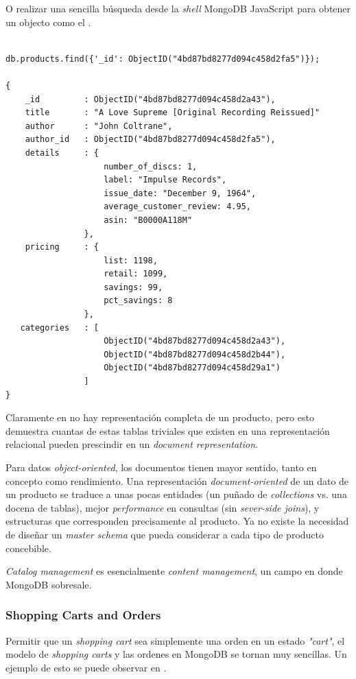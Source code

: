 O realizar una sencilla búsqueda desde la \textit{shell} MongoDB JavaScript  para obtener un objecto  como el .

\medskip
\begin{lstlisting}[caption= Busqueda en MongoDB, label=source:javascript:example_search_mongodb]

db.products.find({'_id': ObjectID("4bd87bd8277d094c458d2fa5")});

{
	_id			: ObjectID("4bd87bd8277d094c458d2a43"),
	title		: "A Love Supreme [Original Recording Reissued]"
	author		: "John Coltrane",
	author_id	: ObjectID("4bd87bd8277d094c458d2fa5"),
	details		: {
					number_of_discs: 1,
					label: "Impulse Records",
   					issue_date: "December 9, 1964",
   					average_customer_review: 4.95,
   					asin: "B0000A118M"
   				},
   	pricing		: {
   					list: 1198,
   					retail: 1099,
   					savings: 99,
   					pct_savings: 8
   				},
   categories	: [
   					ObjectID("4bd87bd8277d094c458d2a43"),
   					ObjectID("4bd87bd8277d094c458d2b44"), 
   					ObjectID("4bd87bd8277d094c458d29a1")
   				]
}
\end{lstlisting}

Claramente en  no hay  representación completa de un producto, pero esto demuestra cuantas de estas tablas triviales que existen en una representación relacional pueden prescindir en un \textit{document representation}.

Para datos \textit{object-oriented}, los documentos tienen mayor sentido, tanto en concepto como rendimiento. Una representación \textit{document-oriented} de un dato de un producto se traduce a unas pocas entidades (un puñado de \textit{collections} vs. una docena de tablas), mejor \textit{performance} en consultas (sin \textit{sever-side joins}), y estructuras que corresponden precisamente al producto. Ya no existe la necesidad de diseñar un \textit{master schema} que pueda considerar a cada tipo de producto concebible.

\textit{Catalog management} es esencialmente \textit{content management}, un campo en donde MongoDB sobresale.

\subsubsection{Shopping Carts and Orders}

Permitir que un \textit{shopping cart} sea simplemente una orden en un estado  \textit{"cart"}, el modelo de \textit{shopping carts} y las ordenes en MongoDB se tornan muy sencillas. Un ejemplo de esto se puede observar en  .


